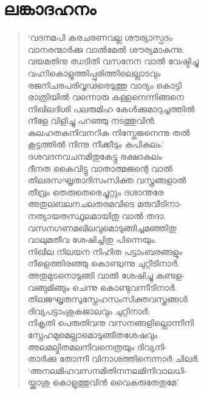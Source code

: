 
\section{ലങ്കാദഹനം}

\begin{verse}
‘വദനമപി കരചരണവല്ല ശൗര്യാസ്പദം\\
വാനരന്മാര്‍ക്കു വാല്‍മേല്‍ ശൗര്യമാകുന്നു.\\
വയമതിനു ഝടിതി വസനേന വാല്‍ വേഷ്ടിച്ചു\\
വഹ്നികൊളുത്തിപ്പുരിത്തിലെല്ലാടവും\\
രജനിചരപരിവൃഢരെടുത്തു വാദ്യം കൊട്ടി\\
രാത്രിയില്‍ വന്നൊരു കള്ളനെന്നിങ്ങനെ\\
നിഖിലദിശി പലരുമിഹ കേള്‍ക്കുമാറുച്ചത്തില്‍\\
നീളേ വിളിച്ചു പറഞ്ഞു നടത്തുവിന്‍.\\
കുലഹതകനിവനറിക നിസ്തേജനെന്നു തല്‍\\
കൂട്ടത്തില്‍ നിന്നു നീക്കീടും കപികുലം.’\\
ദശവദനവചനമിതുകേട്ടു രക്ഷാകുലം\\
ദീനത കൈവിട്ടു വാതാത്മജന്റെ വാല്‍\\
തിലരസഘൃതാദിസംസിക്ത വസ്ത്രങ്ങളാല്‍\\
തീവ്രം തെരുതെരെച്ചുറ്റും ദശാന്തരേ\\
അതുലബലനചലതരമവിടെ മരുവീടിനാ-\\
നത്യായതസ്ഥൂലമായിതു വാല്‍ തദാ.\\
വസനഗണമഖിലവുമൊടുങ്ങിച്ചമഞ്ഞിതു\\
വാലുമതീവ ശേഷിച്ചിതു പിന്നെയും.\\
നിഖില നിലയന നിഹിത പട്ടാംബരങ്ങളും\\
നീളെത്തിരഞ്ഞു കൊണ്ട്വന്നു ചുറ്റീടിനാര്‍.\\
അതുമുടനൊടുങ്ങി വാല്‍ ശേഷിച്ചു കണ്ടള-\\
വങ്ങുമിങ്ങും ചെന്നു കൊണ്ടുവന്നീടിനാര്‍.\\
തിലജഘൃതസുസ്നേഹസംസിക്തവസ്ത്രങ്ങള്‍\\
ദിവ്യപട്ടാംശുകജാലവും ചുറ്റിനാര്‍.\\
നികൃതി പെരുതിവനു വസനങ്ങളില്ലൊന്നിനി\\
സ്നേഹമുമെല്ലാമൊടുങ്ങീതശേഷവും\\
അലമല്മിതമലനിവനെത്രയും ദിവ്യനി-\\
താര്‍ക്കു തോന്നീ വിനാശത്തിനെന്നാര്‍ ചിലര്‍.\\
‘അനലമിഹവസനമിതിനനലമിനിവാലധി-\\
യ്ക്കാശു കൊളുത്തുവിന്‍ വൈകരുതേതുമേ’\\

\end{verse}
